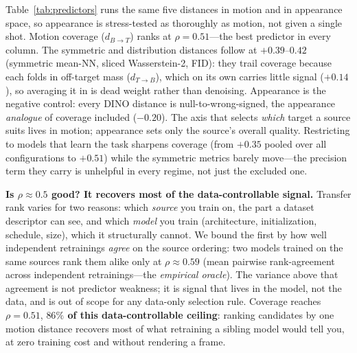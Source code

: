 \documentclass[runningheads]{llncs}
\newcommand{\dtb}{d_{T\to B}}
\newcommand{\dbt}{d_{B\to T}}
\begin{document}
\begin{table}[t]
\centering
\caption{\textbf{The same five distances, in motion and in appearance.}
Within-context Spearman $\rho$ between peak transfer and each (negated) distance,
on the models that learn the task (from-scratch$\times$semantic excluded,
Sec.~\ref{sec:setup}), split by target stratum (``sem.''\ is the learning,
backbone configurations). The same five distances---two directed
(coverage/recall $\dbt$, off-target/precision $\dtb$), the symmetric mean-NN, and
two distribution distances (sliced Wasserstein-2, FID)---are computed in
motion (BFV) and appearance (DINO) space, so appearance gets the same battery as
motion, not a single test. Motion coverage (\textbf{bold}) is the best predictor
in every column; every appearance distance is null-to-wrong-signed. The
target-selective signal lives in motion---appearance sets only a source's overall
quality. The symmetric and distribution distances trail motion coverage because
they fold in off-target mass ($\dtb$), which carries little independent signal.}
\label{tab:predictors}
\small
\setlength{\tabcolsep}{4.5pt}

\end{table}

Table~\ref{tab:predictors} runs the same five distances in motion and in
appearance space, so appearance is stress-tested as thoroughly as motion, not
given a single shot. Motion coverage ($\dbt$) ranks at $\rho{=}0.51$---the best
predictor in every column. The symmetric and distribution distances follow at
$+0.39$--$0.42$ (symmetric mean-NN, sliced Wasserstein-2, FID): they trail
coverage because each folds in off-target mass ($\dtb$), which on its own carries
little signal ($+0.14$), so averaging it in is dead weight rather than denoising.
Appearance is the negative control: every DINO distance is null-to-wrong-signed,
the appearance \emph{analogue} of coverage included ($-0.20$). The axis
that selects \emph{which} target a source suits lives in motion; appearance sets
only the source's overall quality.
Restricting to models that learn the task sharpens coverage (from $+0.35$ pooled
over all configurations to $+0.51$) while the symmetric metrics barely move---the
precision term they carry is unhelpful in every regime, not just the excluded
one.

\noindent\textbf{Is $\rho{\approx}0.5$ good? It recovers most of the
data-controllable signal.} Transfer rank varies for two reasons: which
\emph{source} you train on, the part a dataset descriptor can see, and which
\emph{model} you train (architecture, initialization, schedule, size), which it
structurally cannot. We bound the first by how well independent retrainings
\emph{agree} on the source ordering: two models trained on the same sources rank
them alike only at $\rho{\approx}0.59$ (mean pairwise rank-agreement across
independent retrainings---the \emph{empirical oracle}). The variance above that
agreement is not predictor weakness; it is signal that lives in the model, not
the data, and is out of scope for any data-only selection rule. Coverage reaches
$\rho{=}0.51$, \textbf{$86\%$ of this data-controllable ceiling}: ranking
candidates by one motion distance recovers most of what retraining a sibling
model would tell you, at zero training cost and without rendering a frame.
\end{document}
